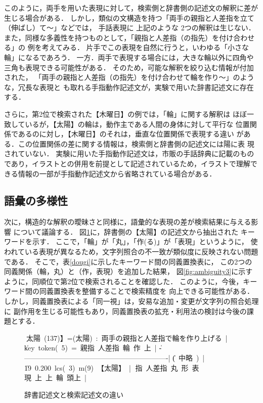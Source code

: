このように，両手を用いた表現に対して，検索側と辞書側の記述文の解釈に差が
生じる場合がある．
しかし，類似の文構造を持つ「両手の親指と人差指を立て（伸ばし）て〜」などでは，
手話表現に 上記のような 2つの解釈は生じない．
また，同様な多義性を持つものとして，「親指と人差指（の指先）を付け合わせる」の
例を考えてみる．
片手でこの表現を自然に行うと，いわゆる「小さな輪」になるであろう．
一方．両手で表現する場合には，大きな輪以外に四角や三角も表現できる可能性がある．
そのため，可能な解釈を絞り込む情報が付加された，
「両手の親指と人差指（の指先）を付け合わせて輪を作り〜」のような，冗長な表現と
も取れる手指動作記述文が，実験で用いた辞書記述文に存在する．

さらに，第2位で検索された【木曜日】の例では，「輪」に関する解釈は
ほぼ一致しているが，【太陽】の輪は，動作主である人間の身体に対して平行な
位置関係であるのに対し，【木曜日】のそれは，垂直な位置関係で表現する違い
がある．この位置関係の差に関する情報は，検索側と辞書側の記述文には陽に表
現されていない．
実験に用いた手指動作記述文は，市販の手話辞典に記載のもの
であり，イラストとの併用を前提として記述されているため，イラストで理解で
きる情報の一部が手指動作記述文から省略されている場合がある．



\subsection {語彙の多様性}

次に，構造的な解釈の曖昧さと同様に，語彙的な表現の差が検索結果に与える影響
について議論する．
図\ref{fig:ambiguity2}に，辞書側の【太陽】の記述文から抽出された
キーワードを示す．
ここで，「輪」が「丸」，「作(る)」が「表現」というように，
使われている表現が異なるため，文字列照合の不一致が類似度に反映されない問題である．
そこで，表\ref{dougi}に示したキーワード間の同義置換表に，
この2つの同義関係（輪，丸）と（作，表現）を追加した結果，
図\ref{fig:ambiguity3}に示すように，同順位で第2位で検索されることを確認した．
このように，今後，キーワード間の同義置換表を整備することで検索精度を
向上できる可能性がある．
しかし，同義置換表による「同一視」は，安易な追加・変更が文字列の照合処理に
副作用を生じる可能性もあり，同義置換表の拡充・利用法の検討は今後の課題とする．


\begin{figure}[tb]
\vbox{\footnotesize\tabcolsep=3pt
\hbox{\|【太陽 (137)】=(太陽) : 両手の親指と人差指で輪を作り上げる |}
\hbox{\| key token( 5) = 親指 人差指 輪 作 上                         |}
\hbox{\|--------------------------------------------------------------|}
\hbox{\| ( 中略 ) |}
\hbox{\| 19 0.200 lcs( 3) m(9) 【太陽】 |}
\hbox{\|                        親指 人差指 丸 形 表現 上 上 輪 頭上 |}
}
\centerline{}
\caption{辞書記述文と検索記述文の違い}
\label{fig:ambiguity2}
\end{figure}

